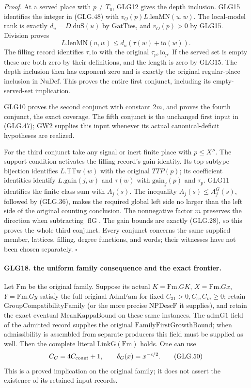 \documentclass[11pt,a4paper]{article}
\numberwithin{equation}{section}
\theoremstyle{remark}\newtheorem{remark}[theorem]{Remark}
\begin{document}
\emph{Proof.}
At a served place with \(p\ne T_u\), GLG12 gives the
depth inclusion. GLG15 identifies the integer in
(GLG.48) with \(v_O(p)L.\mathrm{lenMN}(u,w)\).
The local-model rank is exactly \(d_u=D.\mathrm{duS}(u)\)
by \(\mathrm{GatTies}\), and \(v_O(p)>0\) by GLG15.
Division proves
\[
           L.\mathrm{lenMN}(u,w)\le d_u(\tau(w)+\mathrm{io}(w)).
 \]
The filling record identifies \(\tau,\mathrm{io}\)
with the original \(\tau_p,\mathrm{io}_p\).
If the served set is empty these are both zero by their
definitions, and the length is zero by GLG15. The depth
inclusion then has exponent zero and is exactly the
original regular-place inclusion in \(\mathrm{NuDef}\).
This proves the entire first conjunct, including its
empty-served-set implication.

GLG10 proves the second conjunct with constant \(2m\),
and proves the fourth conjunct, the exact coverage.
The fifth conjunct is the unchanged first input in
(GLG.47); GW2 supplies this input whenever its actual
canonical-deficit hypotheses are realized.

For the third conjunct take any signal or inert finite
place with \(p\le X''\). The support condition activates
the filling record's gain identity. Its top-subtype
bijection identifies \(L.\mathrm{TTw}(w)\) with the
original \(TTP(p)\); its coefficient identities
identify \(L.\mathrm{gain}(j,w)\) and \(\tau(w)\)
with \(\mathrm{gain}_j(p)\) and \(\tau_p\).
GLG11 identifies the finite class sum with \(A_j(s)\).
The inequality \(A_j(s)\le A_j^G(s)\), followed by
(GLG.36), makes the required global left side no larger
than the left side of the original counting conclusion.
The nonnegative factor \(m\) preserves the direction
when subtracting \(\operatorname{flG}\).
The gain bounds are exactly (GLG.28), so this proves
the whole third conjunct. Every conjunct concerns the
same supplied member, lattices, filling, degree functions,
and words; their witnesses have not been chosen separately.
\hfill\(\square\)

\paragraph{GLG18. the uniform family consequence and the exact frontier.}
\label{claim:GLG18}
Let \(\mathrm{Fm}\) be the original family. Suppose its
actual \(K=\mathrm{Fm}.GK\), \(X=\mathrm{Fm}.Gx\),
\(Y=\mathrm{Fm}.Gy\) satisfy the full original
\(\mathrm{AdmFam}\) for fixed \(C_{31}>0,C_e,C_m\ge0\);
retain \(\mathrm{GroupCompatibilityFamily}\) (or the
more precise \(\mathrm{NPDescF}\) it supplies), and retain
the exact eventual \(\mathrm{MeanKappaBound}\) on these
same instances. The \(\mathrm{admG1}\) field of the
admitted record supplies the original
\(\mathrm{FamilyFirstGrowthBound}\); when admissibility
is assembled from separate producers this field must
be supplied as well.
Then the complete literal \(\mathrm{LinkG}(\mathrm{Fm})\)
holds. One can use
\[
 C_G=4C_{\rm count}+1,\qquad
                   \delta_G(x)=x^{-\epsilon/2}.                  \tag{GLG.50}
\]
This is a proved implication on the original family;
it does not assert the existence of its retained input records.
\end{document}
